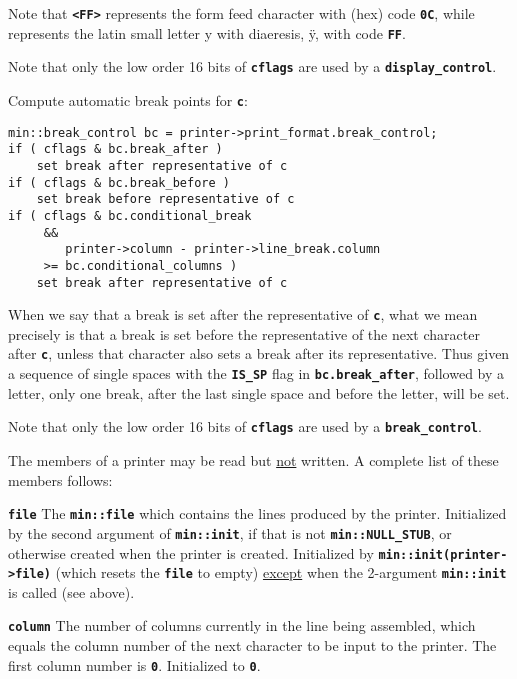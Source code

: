 \documentclass[12pt]{article}
\makeatletter
\newcommand{\TT}[1]{{\tt \bfseries #1}}
\newcommand{\ttmkey}[2]{\TT{#1}\index{#1@{\tt #1}!#2}}
\newcommand{\EOL}{\penalty \exhyphenpenalty}
\newenvironment{indpar}[1][0.3in]%
	{\begin{list}{}%
		     {\setlength{\itemsep}{0in}%
		      \setlength{\topsep}{0in}%
		      \setlength{\parsep}{1ex}%
		      \setlength{\labelwidth}{#1}%
		      \setlength{\leftmargin}{#1}%
		      \addtolength{\leftmargin}{\labelsep}}%
	 \item}%
	{\end{list}}
\newenvironment{itemlist}[1][1.2in]%
	{\begin{list}{}{\setlength{\labelwidth}{#1}%
		        \setlength{\leftmargin}{\labelwidth}%
		        \addtolength{\leftmargin}{+0.2in}%
		        \renewcommand{\makelabel}[1]{##1\hfill}}}%
	{\end{list}}
\makeatother
\begin{document}
\begin{enumerate}
Note that \TT{<FF>} represents the form feed character with (hex)
code \TT{0C}, while \TT{<0FF>} represents the
latin small letter y with diaeresis, \"y, with code \TT{FF}.

Note that only the low order 16 bits of \TT{cflags} are used
by a \TT{display\_control}.

\item Compute automatic break points for \TT{c}:%
\label{COMPUTE-AUTOMATIC-BREAK-POINTS}
\begin{indpar}\begin{verbatim}
min::break_control bc = printer->print_format.break_control;
if ( cflags & bc.break_after )
    set break after representative of c
if ( cflags & bc.break_before )
    set break before representative of c
if ( cflags & bc.conditional_break
     &&
        printer->column - printer->line_break.column
     >= bc.conditional_columns )
    set break after representative of c
\end{verbatim}\end{indpar}

When we say that a break is set after the representative of \TT{c},
what we mean precisely is that a break is set before the representative
of the next character after \TT{c}, unless that character also sets
a break after its representative.  Thus given a sequence of single
spaces with the \TT{IS\_\EOL SP} flag in \TT{bc.break\_\EOL after},
followed by a letter, only one break, after the last single space
and before the letter, will be set.

Note that only the low order 16 bits of \TT{cflags} are used
by a \TT{break\_control}.

\end{enumerate}

The members of a printer may be read but \underline{not} written.
A complete list of these members follows:

\begin{itemlist}[0.8in]

\item[\ttmkey{file}{in {\tt min::printer}}]
The \TT{min::file} which contains the lines produced by the printer.
Initialized by the second argument of \TT{min::\EOL init}, if that is
not \TT{min::\EOL NULL\_\EOL STUB}, or otherwise created when the
printer is created.  Initialized by \TT{min::\EOL init(printer->\EOL file)}
(which resets the \TT{file} to empty)
\underline{except} when the 2-argument \TT{min::\EOL init}
is called (see above).


\item[\ttmkey{column}{in {\tt min::printer}}]
The number of columns currently in the line being assembled,
which equals the column number of the next character to be input to the
printer.  The first column number is \TT{0}.  Initialized to \TT{0}.

\end{itemlist}
\end{document}
